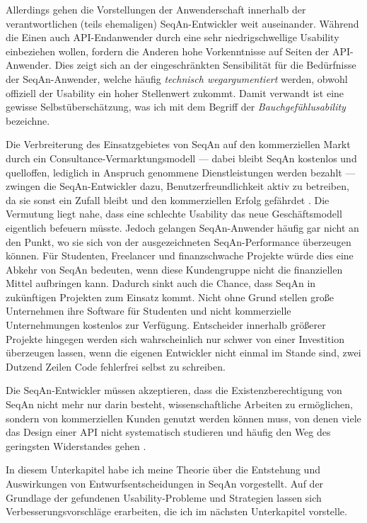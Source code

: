 Allerdings gehen die Vorstellungen der Anwenderschaft innerhalb der verantwortlichen (teils ehemaligen) SeqAn-Entwickler weit auseinander. Während die Einen auch API-Endanwender durch eine sehr niedrigschwellige Usability einbeziehen wollen, fordern die Anderen hohe Vorkenntnisse auf Seiten der API-Anwender. Dies zeigt sich an der eingeschränkten Sensibilität für die Bedürfnisse der SeqAn-Anwender, welche häufig \textit{technisch wegargumentiert} \citep{Sarodnick:2006vc} werden, obwohl offiziell der Usability ein hoher Stellenwert zukommt. Damit verwandt ist eine gewisse Selbstüberschätzung, was ich mit dem Begriff der \textit{Bauchgefühlusability} bezeichne.


Die Verbreiterung des Einsatzgebietes von SeqAn auf den kommerziellen Markt durch ein Consultance-Vermarktungsmodell --- dabei bleibt SeqAn kostenlos und quelloffen, lediglich in Anspruch genommene Dienstleistungen werden bezahlt --- zwingen die SeqAn-Entwickler dazu, Benutzerfreundlichkeit aktiv zu betreiben, da sie sonst ein Zufall bleibt \citep{Stylos:2009ts} und den kommerziellen Erfolg gefährdet \citep{sunshine2014searching}. Die Vermutung liegt nahe, dass eine schlechte Usability das neue Geschäftsmodell eigentlich befeuern müsste. Jedoch gelangen SeqAn-Anwender häufig gar nicht an den Punkt, wo sie sich von der ausgezeichneten SeqAn-Performance überzeugen können. Für Studenten, Freelancer und finanzschwache Projekte würde dies eine Abkehr von SeqAn bedeuten, wenn diese Kundengruppe nicht die finanziellen Mittel aufbringen kann. Dadurch sinkt auch die Chance, dass SeqAn in zukünftigen Projekten zum Einsatz kommt. Nicht ohne Grund stellen große Unternehmen ihre Software für Studenten und nicht kommerzielle Unternehmungen kostenlos zur Verfügung. Entscheider innerhalb größerer Projekte hingegen werden sich wahrscheinlich nur schwer von einer Investition überzeugen lassen, wenn die eigenen Entwickler nicht einmal im Stande sind, zwei Dutzend Zeilen Code fehlerfrei selbst zu schreiben.

Die SeqAn-Entwickler müssen akzeptieren, dass die Existenzberechtigung von SeqAn nicht mehr nur darin besteht, wissenschaftliche Arbeiten zu ermöglichen, sondern von kommerziellen Kunden genutzt werden können muss, von denen viele das Design einer API nicht systematisch studieren \citep{DaqingHou:2005ba} und häufig den Weg des geringsten Widerstandes gehen \citep{Ko:2005cl}.


\bigskip

In diesem Unterkapitel habe ich meine Theorie über die Entstehung und Auswirkungen von Entwurfsentscheidungen in SeqAn vorgestellt. Auf der Grundlage der gefundenen Usability-Probleme und Strategien lassen sich Verbesserungsvorschläge erarbeiten, die ich im nächsten Unterkapitel vorstelle.